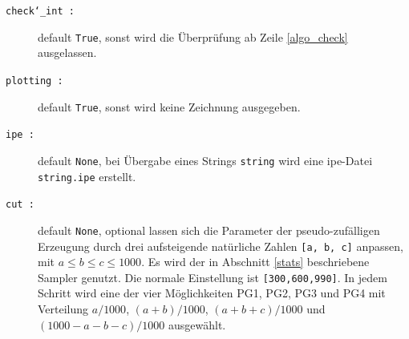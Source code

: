 \begin{description}
\begin{description}
\item[\texttt{check\char`_int :}] default \texttt{True}, sonst wird die Überprüfung ab Zeile \ref{algo_check} ausgelassen.
\item[\texttt{plotting :}] default \texttt{True}, sonst wird keine Zeichnung ausgegeben.
\item[\texttt{ipe :}] default \texttt{None}, bei Übergabe eines Strings \texttt{string} wird eine ipe-Datei \texttt{string.ipe} erstellt.
\item[\texttt{cut :}] default \texttt{None}, optional lassen sich die Parameter der pseudo-zufälligen Erzeugung durch drei aufsteigende natürliche Zahlen \texttt{[a, b, c]} anpassen, mit $a\leq b\leq c\leq 1000$. Es wird der in Abschnitt \ref{stats} beschriebene Sampler genutzt. Die normale Einstellung ist \texttt{[300,600,990]}. In jedem Schritt wird eine der vier Möglichkeiten PG1, PG2, PG3 und PG4 mit Verteilung $a/1000$, $(a+b)/1000$, $(a+b+c)/1000$ und $(1000-a-b-c)/1000$ ausgewählt.
\end{description}
\end{description}

